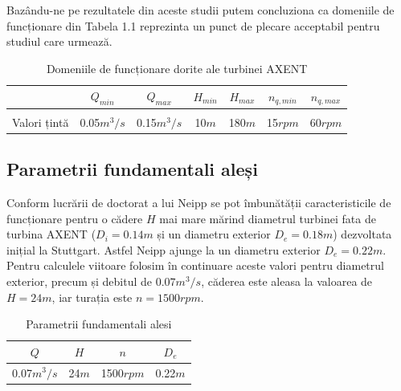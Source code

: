 Bazându-ne pe rezultatele din aceste studii putem concluziona ca domeniile de funcționare din Tabela 1.1 reprezinta un punct de plecare acceptabil pentru studiul care urmează.

\begin{table}[ht]
\caption{Domeniile de funcționare dorite ale turbinei AXENT \cite{neipp2017zweistufige}}%
\centering

\begin{tabular}{ c | c | c | c | c | c | c }
           & $Q_{min}$          & $Q_{max}$          & $H_{min}$    & $H_{max}$     & $n_{q,min}$        & $n_{q,max}$ \\ \hline
&&&&&&\\[-0.5em]
Valori țintă  & 0.05$\si{m^3/s}$ & 0.15$\si{m^3/s}$ & 10$\si{m}$ & 180$\si{m}$ & 15$\si{rpm}$ & 60$\si{rpm}$ \\
\end{tabular}

\end{table}


\subsection{Parametrii fundamentali aleși}

Conform lucrării de doctorat a lui Neipp \cite{neipp2017zweistufige} se pot îmbunătății caracteristicile de funcționare pentru o cădere $H$ mai mare mărind diametrul turbinei fata de turbina AXENT ($D_i = 0.14\si{m}$ și un diametru exterior $D_e = 0.18\si{m}$) dezvoltata inițial la Stuttgart. Astfel Neipp ajunge la un diametru exterior $D_e = 0.22\si{m}$. Pentru calculele viitoare folosim în continuare aceste valori pentru diametrul exterior, precum și debitul de $0.07\si{m^3/s}$, căderea este aleasa la valoarea de $H=24\si{m}$, iar turația este $n=1500\si{rpm}$.

\begin{table}[ht]
\caption{Parametrii fundamentali alesi}%
\centering

\begin{tabular}{ c | c | c | c }
$Q$ & $H$ & $n$ & $D_e$ \\ \hline
0.07$\si{m^3/s}$ & 24$\si{m}$ & 1500$\si{rpm}$ & 0.22$\si{m}$ \\
\end{tabular}

\end{table}